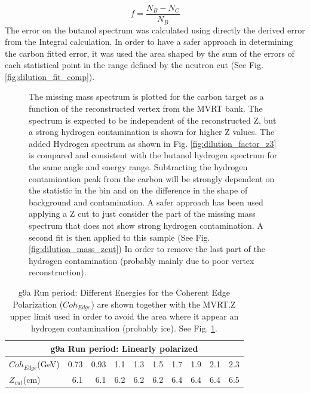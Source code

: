 $$
f = \frac{N_B - N_C}{N_B}
$$
The error on the butanol spectrum was calculated using directly the derived error from the Integral calculation. In order to have a safer approach in determining the carbon fitted error, it was used the area shaped by the sum of the errors of each statistical point in the range defined by the neutron cut (See Fig. \ref{fig:dilution_fit_comp}). 
\begin{figure}[htb]
  \begin{center}
    \qquad
    \qquad

    \caption{The missing mass spectrum is plotted for the carbon target as a function of the reconstructed vertex from the MVRT bank. The spectrum is expected to be independent of the reconstructed Z, but a strong hydrogen contamination is shown for higher Z values. The added Hydrogen spectrum as shown in Fig. \ref{fig:dilution_factor_z3} is compared and consistent with the butanol hydrogen spectrum for the same angle and energy range. Subtracting the hydrogen contamination peak from the carbon will be strongly dependent on the statistic in the bin and on the difference in the shape of background and contamination. A safer approach has been used applying a Z cut to just consider the part of the missing mass spectrum that does not show strong hydrogen contamination. A second fit is then applied to this sample (See Fig. \ref{fig:dilution_mass_zcut}) In order to remove the last part of the hydrogen contamination (probably mainly due to poor vertex reconstruction).}
    \label{fig:dilution_factor_z0}
  \end{center}
\end{figure}

\begin{table}
  \begin{center}
    \begin{tabular}{ ||l|r|r|r|r|r|r|r|r|r||}
      \hline
      \multicolumn{10}{|c|}{g9a Run period: Linearly polarized } \\
      \hline
      $Coh_{Edge}$(GeV)&0.73&0.93&1.1&1.3&1.5&1.7&1.9&2.1&2.3 \\
      \hline
      $Z_{cut}$(cm)&6.1&6.1&6.2&6.2&6.2&6.4&6.4&6.4&6.5 \\
      \hline
    \end{tabular}
  \end{center}
  \caption{g9a Run period: Different Energies for the Coherent Edge Polarization ($Coh_{Edge}$) are shown together with the MVRT.Z upper limit used in order to avoid the area where it appear an hydrogen contamination (probably ice). See Fig. \ref{fig:dilution_factor_z0}.}
  \label{table:dil_factor_zcut}
\end{table}

